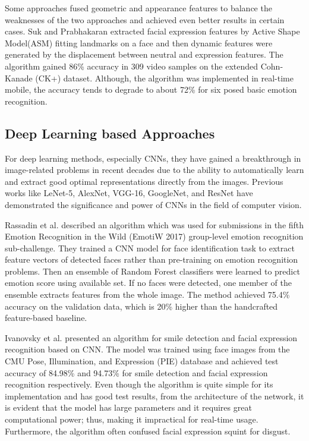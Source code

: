 \documentclass[master]{thesis-uestc}
\begin{document}
Some approaches fused geometric and appearance features to balance the weaknesses of the two approaches and achieved even better results in certain cases. Suk and Prabhakaran extracted facial expression features by Active Shape Model(ASM) fitting landmarks on a face and then dynamic features were generated by the displacement between neutral and expression features. The algorithm gained 86\% accuracy in 309 video samples on the extended Cohn-Kanade (CK+) dataset. Although, the algorithm was implemented in real-time mobile, the accuracy tends to degrade to about 72\% for six posed basic emotion recognition.

\subsection{Deep Learning based Approaches}
For deep learning methods, especially CNNs, they have gained a breakthrough in image-related problems in recent decades due to the ability to automatically learn and extract good optimal representations directly from the images. Previous works like LeNet-5, AlexNet, VGG-16, GoogleNet, and ResNet have demonstrated the significance and power of CNNs in the field of computer vision.

Rassadin et al. described an algorithm which was used for submissions in the fifth Emotion Recognition in the Wild (EmotiW 2017) group-level emotion recognition sub-challenge. They trained a CNN model for face identification task to extract feature vectors of detected faces rather than pre-training on emotion recognition problems. Then an ensemble of Random Forest classifiers were learned to predict emotion score using available set. If no faces were detected, one member of the ensemble extracts features from the whole image. The method achieved 75.4\% accuracy on the validation data, which is 20\% higher than the handcrafted feature-based baseline.

Ivanovsky et al. presented an algorithm for smile detection and facial expression recognition based on CNN. The model was trained using face images from the CMU Pose, Illumination, and Expression (PIE) database and achieved test accuracy of 84.98\% and 94.73\% for smile detection and facial expression recognition respectively. Even though the algorithm is quite simple for its implementation and has good test results, from the architecture of the network, it is evident that the model has large parameters and it requires great computational power; thus, making it impractical for real-time usage. Furthermore, the algorithm often confused facial expression squint for disgust.
\end{document}
